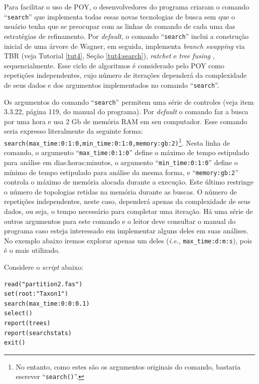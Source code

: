 \begin{refsection}
Para facilitar o uso de POY, o desenvolvedores do programa criaram o comando ``\texttt{search}'' que implementa todas essas novas tecnologias de busca sem que o usuário tenha que se preocupar com as linhas de comando de cada uma das estratégias de refinamento. Por \textit{default}, o comando ``\texttt{search}'' inclui a construção inicial de uma árvore de Wagner, em seguida, implementa \textit{branch swapping} via TBR (veja Tutorial \ref{tut4}, Seção \ref{tut4:search}), \textit{ratchet} \parencite{Nixon_1999} e \textit{tree fusing} \parencite{Goloboff_1999}, sequencialmente. Esse ciclo de algoritmos é considerado pelo POY como repetições independentes, cujo número de iterações dependerá da complexidade de seus dados e dos argumentos implementados no comando ``\texttt{search}''.

Os argumentos do comando ``\texttt{search}'' permitem uma série de controles (veja item 3.3.22, página 119, do manual do programa). Por \textit{default} o comando faz a busca por uma hora e usa 2 Gb de memória RAM em seu computador. Esse comando seria expresso literalmente da seguinte forma: \texttt{search(max\_time:0:1:0,min\_time:0:1:0,memory:gb:2)}\footnote{ No entanto, como estes são os argumentos originais do comando, bastaria escrever ``\texttt{search()}''.}. Nesta linha de comando, o argumento ``\texttt{max\_time:0:1:0}'' define o máximo de tempo estipulado para análise em dias:horas:minutos, o argumento ``\texttt{min\_time:0:1:0}'' define o mínimo de tempo estipulado para análise da mesma forma, e ``\texttt{memory:gb:2}'' controla o máximo de memória alocada durante a execução. Este último restringe o número de topologias retidas na memória durante as buscas. O número de repetições independentes, neste caso, dependerá apenas da complexidade de seus dados, ou seja, o tempo necessário para completar uma iteração. Há uma série de outros argumentos para este comando e o leitor deve consultar o manual do programa caso esteja interessado em implementar alguns deles em suas análises. No exemplo abaixo iremos explorar apenas um deles (\textit{i.e.}, \texttt{max\_time:d:m:s}), pois é o mais utilizado.

	Considere o \textit{script} abaixo:


\begin{lstlisting}[caption= conteúdo do arquivo script1.poy (Tutorial \ref{tut10}),label=tut10:search:script1]
read("partition2.fas")
set(root:"Taxon1")
search(max_time:0:0:0.1)
select()
report(trees)
report(searchstats) 
exit()
\end{lstlisting}


\end{refsection}
